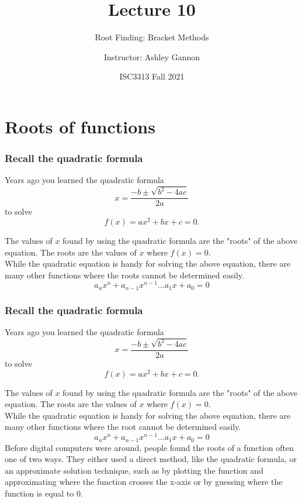 \documentclass{if-beamer}
\title[Lecture 10]{Lecture 10 }
\subtitle{Root Finding: Bracket Methods}
\author{Instructor: Ashley Gannon}
\date{ISC3313 Fall 2021}
\begin{document}
\begin{frame}
  \titlepage
\end{frame}
\section{Roots of functions}
\begin{frame}
\frametitle{Recall the quadratic formula}
Years ago you learned the quadratic formula
$$x = \frac{-b \pm \sqrt{b^2-4ac}}{2a} $$
to solve 
$$f(x) = ax^2 +bx+c =0.$$

The values of $x$ found by using the quadratic formula are the "roots" of the above equation. The roots are the values of $x$ where $f(x)=0$.   \\
\vspace{8pt}
While the quadratic equation is handy for solving the above equation, there are many other functions where the roots cannot be determined easily. 
\begin{equation*}
a_{n} x^{n} + a_{n-1} x^{n-1} \dots a_{1} x + a_{0} = 0
\end{equation*}
\end{frame}

\begin{frame}
\frametitle{Recall the quadratic formula}
Years ago you learned the quadratic formula
$$x = \frac{-b \pm \sqrt{b^2-4ac}}{2a} $$
to solve 
$$f(x) = ax^2 +bx+c =0.$$

The values of $x$ found by using the quadratic formula are the "roots" of the above equation. The roots are the values of $x$ where $f(x)=0$.   \\
\vspace{8pt}
While the quadratic equation is handy for solving the above equation, there are many other functions where the root cannot be determined easily. 
\begin{equation*}
a_{n} x^{n} + a_{n-1} x^{n-1} \dots a_{1} x + a_{0} = 0
\end{equation*}
Before digital computers were around, people found the roots of a function often one of two ways. They either used a direct method, like the quadratic formula, or an approximate solution technique, such as by plotting the function and approximating where the function crosses the x-axis or by guessing where the function is equal to 0. 
\end{frame}
\end{document}
